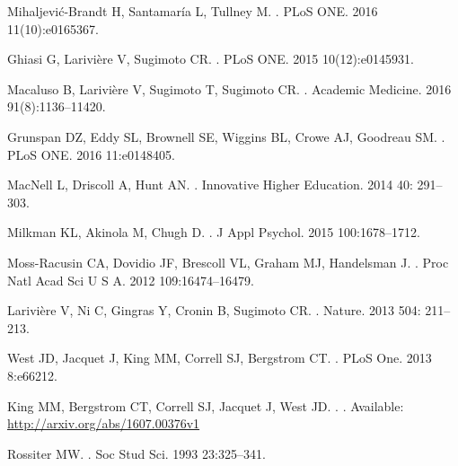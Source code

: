 \documentclass[10pt,letterpaper]{article}
\begin{document}
\begin{flushleft}
\begin{thebibliography}{10}
  Mihaljevi{\'c}-Brandt H, Santamar{\'i}a L, Tullney M.
.
\newblock PLoS ONE. 2016 11(10):e0165367.

Ghiasi G, Larivi{\`e}re V, Sugimoto CR.
.
\newblock PLoS ONE. 2015 10(12):e0145931.

Macaluso B, Larivi{\`e}re V, Sugimoto T, Sugimoto CR.
.
\newblock Academic Medicine. 2016  91(8):1136–11420.

Grunspan DZ, Eddy SL, Brownell SE, Wiggins BL, Crowe AJ, Goodreau SM.
.
\newblock PLoS ONE. 2016 11:e0148405.

MacNell L, Driscoll A, Hunt AN.
.
\newblock   Innovative Higher Education. 2014 40: 291–303.

Milkman KL, Akinola M, Chugh D.
.
\newblock J Appl Psychol. 2015 100:1678–1712.

Moss-Racusin CA, Dovidio JF, Brescoll VL, Graham MJ, Handelsman J.
.
\newblock  Proc Natl Acad Sci U S A. 2012 109:16474–16479.

Larivi{\`e}re V, Ni C, Gingras Y, Cronin B, Sugimoto CR.
.
\newblock  Nature. 2013 504: 211–213.

West JD, Jacquet J, King MM, Correll SJ, Bergstrom CT.
.
\newblock PLoS One. 2013 8:e66212.

King MM, Bergstrom CT, Correll SJ, Jacquet J, West JD.
.
. Available: \url{http://arxiv.org/abs/1607.00376v1}

Rossiter MW.
.
\newblock  Soc Stud Sci. 1993 23:325–341.



\end{thebibliography}
\end{flushleft}
\end{document}
